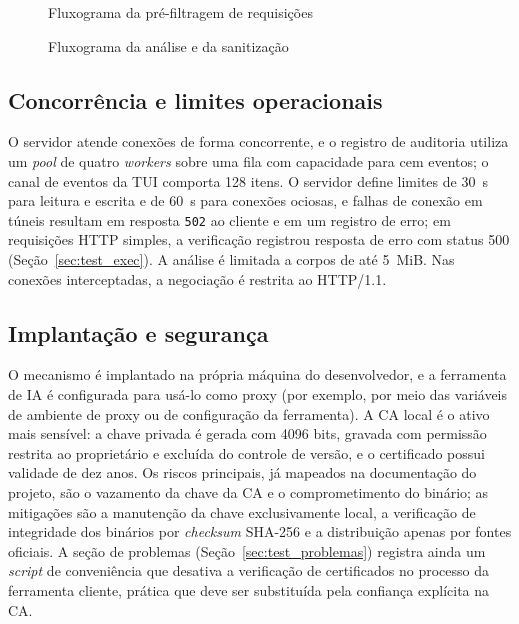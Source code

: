 \begin{figure}[htb]
\centering
\caption{Fluxograma da pré-filtragem de requisições}\label{fig:fluxoa}
\end{figure}

\begin{figure}[htb]
\centering
\caption{Fluxograma da análise e da sanitização}\label{fig:fluxob}
\end{figure}

\subsection{Concorrência e limites operacionais}

O servidor atende conexões de forma concorrente, e o registro de auditoria utiliza um \textit{pool} de quatro \textit{workers} sobre uma fila com capacidade para cem eventos; o canal de eventos da TUI comporta 128 itens. O servidor define limites de 30~s para leitura e escrita e de 60~s para conexões ociosas, e falhas de conexão em túneis resultam em resposta \texttt{502} ao cliente e em um registro de erro; em requisições HTTP simples, a verificação registrou resposta de erro com status 500 (Seção~\ref{sec:test_exec}). A análise é limitada a corpos de até 5~MiB. Nas conexões interceptadas, a negociação é restrita ao HTTP/1.1.

\subsection{Implantação e segurança}

O mecanismo é implantado na própria máquina do desenvolvedor, e a ferramenta de IA é configurada para usá-lo como proxy (por exemplo, por meio das variáveis de ambiente de proxy ou de configuração da ferramenta). A CA local é o ativo mais sensível: a chave privada é gerada com 4096 bits, gravada com permissão restrita ao proprietário e excluída do controle de versão, e o certificado possui validade de dez anos. Os riscos principais, já mapeados na documentação do projeto, são o vazamento da chave da CA e o comprometimento do binário; as mitigações são a manutenção da chave exclusivamente local, a verificação de integridade dos binários por \textit{checksum} SHA-256 e a distribuição apenas por fontes oficiais. A seção de problemas (Seção~\ref{sec:test_problemas}) registra ainda um \textit{script} de conveniência que desativa a verificação de certificados no processo da ferramenta cliente, prática que deve ser substituída pela confiança explícita na CA.

